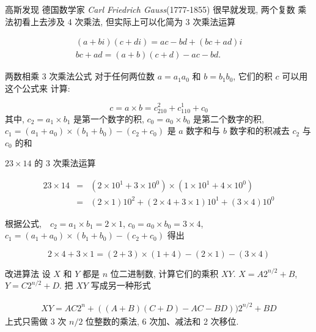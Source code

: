 \documentclass[fontset=fandol,UTF8,fleqn]{beamer}
\begin{document}
\begin{frame}{高斯发现}
德国数学家 \emph{Carl Friedrich Gauss}(1777-1855) 很早就发现, 两个复数
乘法初看上去涉及 4 次乘法, 但实际上可以化简为 3 次乘法运算  
\begin{exampleblock}{}
  \begin{eqnarray*}
  (a+bi)(c+di) = ac - bd +(bc+ad)i   \\
bc + ad = (a+b)(c+d)-ac-bd. 
\end{eqnarray*}
\end{exampleblock}
\end{frame}

\begin{frame}{两数相乘 3 次乘法公式}
对于任何两位数 $a=a_1a_0$ 和 $b=b_1b_0$, 它们的积 $c$ 可以用这个公式来
计算:
\begin{exampleblock}{}
  \begin{displaymath}
  c=a\times b=c_210^2+c_110^1+c_0  
\end{displaymath}
其中, $c_2=a_1\times b_1$ 是第一个数字的积, $c_0=a_0\times b_0$ 是第二个数字的积, $c_1=(a_1+a_0)\times (b_1+b_0)  -(c_2+c_0)$ 是 $a$ 数字和与 $b$ 数字和的积减去 $c_2$ 与 $c_0$ 的和 
\end{exampleblock}
\end{frame}

\begin{frame}{$23 \times 14$ 的 3 次乘法运算}
  \begin{exampleblock}{}
     \begin{eqnarray*}
   23 \times 14 &  = & (2\times 10^1 + 3\times 10^0) \times (1\times 10^1 + 4\times 10^0)   \\
 & = & (2\times 1)10^2+(2\times 4+3\times 1)10^1+(3\times 4)10^0 
     \end{eqnarray*}
   \end{exampleblock}
   根据公式,　$c_2 = a_1\times b_1=2\times 1$,   $c_0=a_0\times
   b_0=3\times 4$,    $c_1=(a_1+a_0)\times (b_1+b_0)-(c_2+c_0)$
   得出 
   
\begin{displaymath}
  2\times 4 + 3\times 1 = (2+3)\times (1+4)-(2\times 1)-(3\times 4) 
\end{displaymath}
\end{frame}

\begin{frame}{改进算法}
设 $X$ 和 $Y$ 都是 $n$ 位二进制数, 计算它们的乘积 $XY$. $X = A 2^{n/2} + B$, $Y = C 2^{n/2} + D$.
把 $XY$ 写成另一种形式

\begin{eqnarray*}
  XY=AC2^n+((A+B)(C+D)-AC-BD))2^{n/2}+BD  
\end{eqnarray*}
上式只需做 3 次 $n/2$ 位整数的乘法, 6 次加、减法和 2 次移位.
\end{frame}
\end{document}
